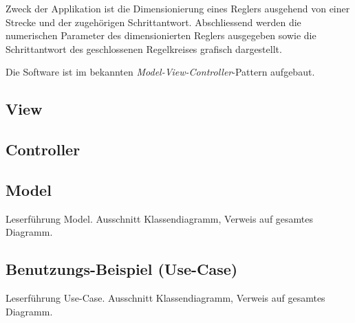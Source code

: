 
Zweck  der Applikation  ist die  Dimensionierung eines  Reglers ausgehend  von
einer  Strecke  und  der  zugeh\"origen  Schrittantwort. Abschliessend  werden
die  numerischen Parameter  des dimensionierten  Reglers ausgegeben  sowie die
Schrittantwort des geschlossenen Regelkreises grafisch dargestellt.

Die   Software    ist   im    bekannten   \emph{Model-View-Controller}-Pattern
aufgebaut.


\subsection{View}



\subsection{Controller}



\subsection{Model}

Leserf\"uhrung Model.
Ausschnitt Klassendiagramm, Verweis auf gesamtes Diagramm.




\subsection{Benutzungs-Beispiel (Use-Case)}

Leserf\"uhrung Use-Case.
Ausschnitt Klassendiagramm, Verweis auf gesamtes Diagramm.


